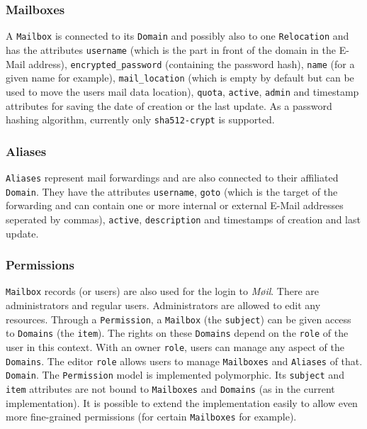 \documentclass[12pt,a4paper]{scrartcl}
\begin{document}
			\subsubsection{Mailboxes}
				A \texttt{Mailbox} is connected to its \texttt{Domain} and
				possibly also to one \texttt{Relocation} and has the attributes
				\texttt{username} (which is the part in front of the
				domain in the E-Mail address), \texttt{encrypted\_password}
				(containing the password hash), \texttt{name} (for a given name
				for example), \texttt{mail\_location} (which is empty by
				default but can be used to move the users mail data location),
				\texttt{quota}, \texttt{active}, \texttt{admin} and timestamp
				attributes for saving the date of creation or the last update.
				As a password hashing algorithm, currently only
				\texttt{sha512-crypt} is supported.

			\subsubsection{Aliases}
				\texttt{Aliases} represent mail forwardings and are also
				connected to their affiliated \texttt{Domain}. They have the
				attributes \texttt{username}, \texttt{goto} (which is the
				target of the forwarding and can contain one or more internal
				or external E-Mail addresses seperated by commas),
				\texttt{active}, \texttt{description} and timestamps of
				creation and last update.

			\subsubsection{Permissions}
				\texttt{Mailbox} records (or users) are also used for the login
				to \emph{Møil}. There are administrators and regular users.
				Administrators are allowed to edit any resources. Through a
				\texttt{Permission}, a \texttt{Mailbox} (the \texttt{subject})
				can be given access to \texttt{Domains} (the \texttt{item}).
				The rights on these \texttt{Domains} depend on the
				\texttt{role} of the user in this context. With an owner
				\texttt{role}, users can manage any aspect of the
				\texttt{Domains}. The editor \texttt{role} allows users to
				manage \texttt{Mailboxes} and \texttt{Aliases} of that.
				\texttt{Domain}. The \texttt{Permission} model is implemented
				polymorphic. Its \texttt{subject} and \texttt{item} attributes
				are not bound to \texttt{Mailboxes} and \texttt{Domains} (as in
				the current implementation). It is possible to extend the
				implementation easily to allow even more fine-grained
				permissions (for certain \texttt{Mailboxes} for example).
\end{document}
